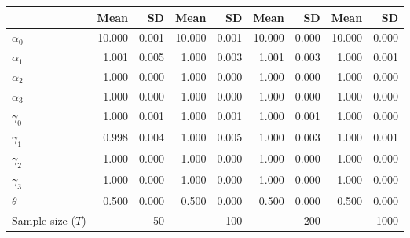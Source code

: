 
\begin{tabular}[t]{lrrrrrrrr}
\toprule
  & Mean & SD & Mean  & SD  & Mean   & SD   & Mean    & SD   \\
\midrule
$\alpha_{0}$ & 10.000 & 0.001 & 10.000 & 0.001 & 10.000 & 0.000 & 10.000 & 0.000\\
$\alpha_{1}$ & 1.001 & 0.005 & 1.000 & 0.003 & 1.001 & 0.003 & 1.000 & 0.001\\
$\alpha_{2}$ & 1.000 & 0.000 & 1.000 & 0.000 & 1.000 & 0.000 & 1.000 & 0.000\\
$\alpha_{3}$ & 1.000 & 0.000 & 1.000 & 0.000 & 1.000 & 0.000 & 1.000 & 0.000\\
$\gamma_{0}$ & 1.000 & 0.001 & 1.000 & 0.001 & 1.000 & 0.001 & 1.000 & 0.000\\
$\gamma_{1}$ & 0.998 & 0.004 & 1.000 & 0.005 & 1.000 & 0.003 & 1.000 & 0.001\\
$\gamma_{2}$ & 1.000 & 0.000 & 1.000 & 0.000 & 1.000 & 0.000 & 1.000 & 0.000\\
$\gamma_{3}$ & 1.000 & 0.000 & 1.000 & 0.000 & 1.000 & 0.000 & 1.000 & 0.000\\
$\theta$ & 0.500 & 0.000 & 0.500 & 0.000 & 0.500 & 0.000 & 0.500 & 0.000\\
Sample size ($T$) &  & 50 &  & 100 &  & 200 &  & 1000\\
\bottomrule
\end{tabular}
